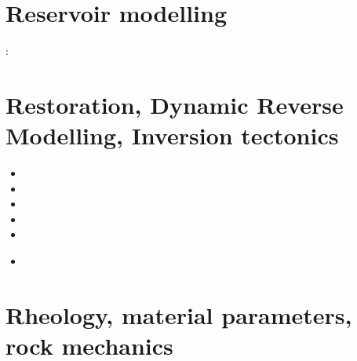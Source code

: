\section{Reservoir modelling}

\begin{scriptsize}
\twothousandthirteen: 
\end{scriptsize}

\section{Restoration, Dynamic Reverse Modelling, Inversion tectonics}

\begin{scriptsize}
\begin{itemize}
\item[\twothousandone] 
\item[\twothousandfour] 
\item[\twothousandfive] 
\item[\twothousandtwelve] 
\item[\twothousandeighteen] 
\item[\twothousandtwenty] 
 \\
\end{itemize}
\end{scriptsize}

\section{Rheology, material parameters, rock mechanics}

